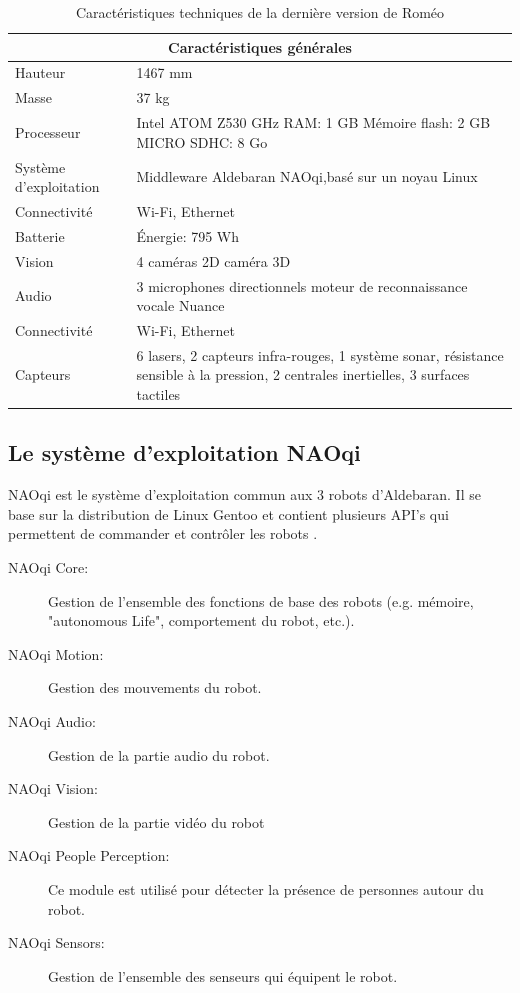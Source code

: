 \begin{table}[H]
	\begin{tabular}{ | l | p{10cm} | }
		\hline
		\multicolumn{2}{|c|}{Caractéristiques générales} \\
		\hline
		Hauteur & 1467 mm \\
		\hline 
		Masse & 37 kg \\
		\hline
		Processeur & Intel ATOM Z530 \newline 1.6 GHz \newline RAM: 1 GB \newline Mémoire flash: 2 GB \newline MICRO SDHC: 8 Go  \\
		\hline
		Système d'exploitation & Middleware Aldebaran NAOqi,\newline basé sur un noyau Linux \\
		\hline
		Connectivité & Wi-Fi, Ethernet \\
		\hline
		Batterie & Énergie: 795 Wh \\
		\hline 
		Vision & 4 caméras 2D \newline 1 caméra 3D \\
		\hline
		Audio & 3 microphones directionnels \newline moteur de reconnaissance vocale Nuance  \\
		\hline
		Connectivité & Wi-Fi, Ethernet \\
		\hline
		Capteurs & 6 lasers, 2 capteurs infra-rouges, 1 système sonar, résistance sensible à la pression, 2 centrales inertielles, 3 surfaces tactiles \\
		\hline
	\end{tabular}
	\caption[Caractéristiques techniques de Roméo]{Caractéristiques techniques de la dernière version de Roméo}
	\label {tab: Caractéristiques techniques de Roméo}
	\cite{RomeoTech}
\end{table}

\subsection{Le système d'exploitation NAOqi}
\label{Entreprise: Les produits: NAOqi}
NAOqi est le système d'exploitation commun aux 3 robots d'Aldebaran. Il se base sur la distribution de Linux Gentoo et contient plusieurs API's qui permettent de commander et contrôler les robots \cite{NAOqiTech}.
\begin{description}
	\item [NAOqi Core:] Gestion de l'ensemble des fonctions de base des robots (e.g. mémoire, "autonomous Life", comportement du robot, etc.).
	\item [NAOqi Motion:] Gestion des mouvements du robot.
	\item [NAOqi Audio:]  Gestion de la partie audio du robot.
	\item [NAOqi Vision:] Gestion de la partie vidéo du robot
	\item [NAOqi People Perception:] Ce module est utilisé pour détecter la présence de personnes autour du robot.
	\item [NAOqi Sensors:]  Gestion de l'ensemble des senseurs qui équipent le robot.
\end{description} 


